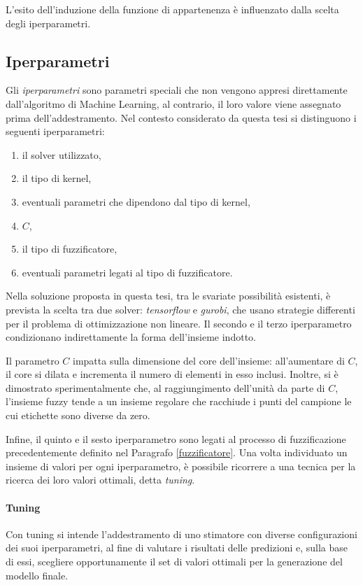\documentclass[12pt]{report}
\theoremstyle{definition}
\begin{document}
L'esito dell'induzione della funzione di appartenenza è influenzato dalla scelta degli iperparametri.

\subsection{Iperparametri}\label{iperparameters}
Gli \textit{iperparametri} sono parametri speciali che non vengono appresi direttamente dall'algoritmo di Machine Learning, al contrario, il loro valore viene assegnato prima dell'addestramento.
Nel contesto considerato da questa tesi si distinguono i seguenti iperparametri: 
\begin{enumerate}
    \item il solver utilizzato,
    \item il tipo di kernel,
    \item eventuali parametri che dipendono dal tipo di kernel,
    \item $C$,
    \item il tipo di fuzzificatore,
    \item eventuali parametri legati al tipo di fuzzificatore.
\end{enumerate}
Nella soluzione proposta in questa tesi, tra le svariate possibilità esistenti, è prevista la scelta tra due solver: \textit{tensorflow} e \textit{gurobi}, che usano strategie differenti per il problema di ottimizzazione non lineare. Il secondo e il terzo iperparametro condizionano indirettamente la forma dell'insieme indotto.

Il parametro $C$ impatta sulla dimensione del core dell'insieme:
all'aumentare di $C$, il core si dilata e incrementa il numero di elementi in esso inclusi.
Inoltre, si è dimostrato sperimentalmente che, al raggiungimento dell'unità da parte di $C$, l'insieme fuzzy tende a un insieme regolare che racchiude i punti del campione le cui etichette sono diverse da zero.

Infine, il quinto e il sesto iperparametro sono legati al processo di fuzzificazione precedentemente definito nel Paragrafo \ref{fuzzificatore}.
Una volta individuato un insieme di valori per ogni iperparametro, è possibile ricorrere a una tecnica per la ricerca dei loro valori ottimali, detta \textit{tuning}.

\paragraph{Tuning} Con tuning si intende l'addestramento di uno stimatore con diverse configurazioni dei suoi iperparametri, al fine di valutare i risultati delle predizioni e, sulla base di essi, scegliere opportunamente il set di valori ottimali per la generazione del modello finale.
\end{document}
